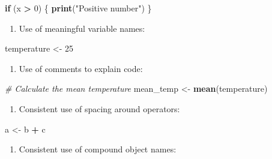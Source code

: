 \documentclass[
  10t,
]{article}
\newenvironment{Shaded}{\begin{snugshade}}{\end{snugshade}}
\newcommand{\CommentTok}[1]{\textcolor[rgb]{0.56,0.35,0.01}{\textit{#1}}}
\newcommand{\ControlFlowTok}[1]{\textcolor[rgb]{0.13,0.29,0.53}{\textbf{#1}}}
\newcommand{\DecValTok}[1]{\textcolor[rgb]{0.00,0.00,0.81}{#1}}
\newcommand{\FunctionTok}[1]{\textcolor[rgb]{0.13,0.29,0.53}{\textbf{#1}}}
\newcommand{\NormalTok}[1]{#1}
\newcommand{\OtherTok}[1]{\textcolor[rgb]{0.56,0.35,0.01}{#1}}
\newcommand{\SpecialCharTok}[1]{\textcolor[rgb]{0.81,0.36,0.00}{\textbf{#1}}}
\newcommand{\StringTok}[1]{\textcolor[rgb]{0.31,0.60,0.02}{#1}}
\providecommand{\tightlist}{%
  \setlength{\itemsep}{0pt}\setlength{\parskip}{0pt}}
\begin{document}
\begin{Shaded}
\begin{Highlighting}[]
\ControlFlowTok{if}\NormalTok{ (x }\SpecialCharTok{\textgreater{}} \DecValTok{0}\NormalTok{) \{}
  \FunctionTok{print}\NormalTok{(}\StringTok{"Positive number"}\NormalTok{)}
\NormalTok{\}}
\end{Highlighting}
\end{Shaded}

\begin{enumerate}
\def\labelenumi{\arabic{enumi}.}
\setcounter{enumi}{1}
\tightlist
\item
  Use of meaningful variable names:
\end{enumerate}

\begin{Shaded}
\begin{Highlighting}[]
\NormalTok{temperature }\OtherTok{\textless{}{-}} \DecValTok{25}
\end{Highlighting}
\end{Shaded}

\begin{enumerate}
\def\labelenumi{\arabic{enumi}.}
\setcounter{enumi}{2}
\tightlist
\item
  Use of comments to explain code:
\end{enumerate}

\begin{Shaded}
\begin{Highlighting}[]
\CommentTok{\# Calculate the mean temperature}
\NormalTok{mean\_temp }\OtherTok{\textless{}{-}} \FunctionTok{mean}\NormalTok{(temperature)}
\end{Highlighting}
\end{Shaded}

\begin{enumerate}
\def\labelenumi{\arabic{enumi}.}
\setcounter{enumi}{3}
\tightlist
\item
  Consistent use of spacing around operators:
\end{enumerate}

\begin{Shaded}
\begin{Highlighting}[]
\NormalTok{a }\OtherTok{\textless{}{-}}\NormalTok{ b }\SpecialCharTok{+}\NormalTok{ c}
\end{Highlighting}
\end{Shaded}

\begin{enumerate}
\def\labelenumi{\arabic{enumi}.}
\setcounter{enumi}{4}
\tightlist
\item
  Consistent use of compound object names:
\end{enumerate}
\end{document}
